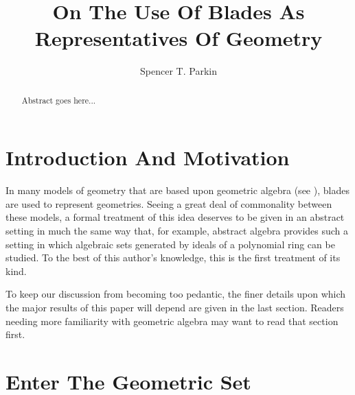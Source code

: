 \documentclass{birkjour}
\theoremstyle{definition}
\theoremstyle{remark}
\numberwithin{equation}{section}
\begin{document}
\title{On The Use Of Blades As Representatives Of Geometry}

\author{Spencer T. Parkin}
\address{102 W. 500 S., \\
Salt Lake City, UT  84101} 



\begin{abstract}
Abstract goes here...
\end{abstract}


\maketitle

\section{Introduction And Motivation}

In many models of geometry that are based upon geometric algebra (see \cite{}), blades are used
to represent geometries.  Seeing a great deal of commonality between these models, a formal
treatment of this idea deserves to be given in an abstract setting in much the same way that,
for example, abstract algebra provides such a setting in which algebraic sets generated by ideals
of a polynomial ring can be studied.  To the best of this author's knowledge, this is the first treatment of its kind.

To keep our discussion from becoming too pedantic, the finer details upon which the major results of this paper will depend are given
in the last section.  Readers needing more familiarity with geometric algebra may want to read that section first.

\section{Enter The Geometric Set}
\end{document}
